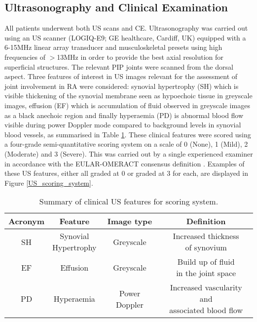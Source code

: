 \documentclass[twoside]{bhamthesis}
\theoremstyle{definition}
\begin{document}
\egroup

\subsection{Ultrasonography and Clinical Examination}

All patients underwent both US scans and CE. Ultrasonography was carried out using an US scanner (LOGIQ-E9; GE healthcare, Cardiff, UK) equipped with a 6-15MHz linear array transducer and musculoskeletal presets using high frequencies of $>$13MHz in order to  provide the best axial resolution for superficial structures. The relevant PIP joints were scanned from the dorsal aspect. Three features of interest in US images relevant for the assessment of joint involvement in RA were considered: synovial hypertrophy (SH) which is visible thickening of the synovial membrane seen as hypoechoic tissue in greyscale images, effusion (EF) which is accumulation of fluid observed in greyscale images as a black anechoic region and finally hyperaemia (PD) is abnormal blood flow visible during power Doppler mode compared to background levels in synovial blood vessels, as summarised in Table \ref{tab:USfeaturestable}. These clinical features were scored using a four-grade semi-quantitative scoring system on a scale of 0 (None), 1 (Mild), 2 (Moderate) and 3 (Severe). This was carried out by a single experienced examiner in accordance with the EULAR-OMERACT
consensus definition \cite{terslev2017scoring,d2017scoring}. Examples of these US features, either all graded at 0 or graded at 3 for each, are displayed in Figure \ref{US_scoring_system}.
 
\bgroup
\def\arraystretch{1.2}
\begin{table}[!ht]
\begin{center}
 \begin{tabular}{c c c c}
 \hline
 \textbf{Acronym} & \textbf{Feature} & \textbf{Image type} & \textbf{Definition} \\ [1.5ex] 
 \hline
 SH & \thead{Synovial \\ Hypertrophy} & Greyscale & \thead{Increased thickness \\ of synovium}\\ 
 EF & Effusion & Greyscale &  \thead{Build up of fluid \\ in the joint space}\\
 PD & Hyperaemia & Power Doppler & \thead{Increased vascularity and \\ associated blood flow}\\
  \hline
\end{tabular}
\caption{Summary of clinical US features for scoring system.}
\label{tab:USfeaturestable}
\end{center}
\end{table}
\egroup
\end{document}
